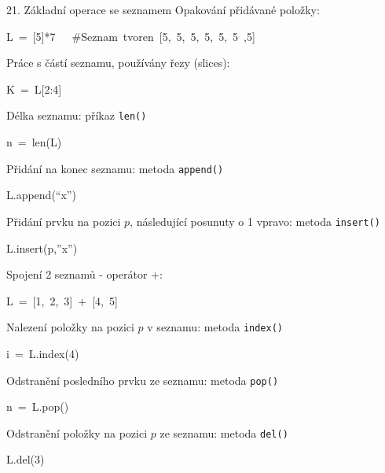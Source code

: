 \documentclass[czech]{beamer}
\newenvironment{lyxcode}
  {\par\begin{list}{}{
    \setlength{\rightmargin}{\leftmargin}
    \setlength{\listparindent}{0pt}%
    \raggedright
    \setlength{\itemsep}{0pt}
    \setlength{\parsep}{0pt}
    \normalfont\ttfamily}%
   \def\{{\char`\{}
   \def\}{\char`\}}
   \def\textasciitilde{\char`\~}
   \item[]}
  {\end{list}}
\begin{document}
\begin{frame}[plain]{21. Základní operace se seznamem}
{\scriptsize Opakování přidávané položky:}{\scriptsize\par}
\begin{lyxcode}
{\scriptsize L~=~{[}5{]}{*}7~~~\#Seznam~tvoren~{[}5,~5,~5,~5,~5,~5~,5{]}}{\scriptsize\par}
\end{lyxcode}
{\scriptsize Práce s částí seznamu, používány řezy (slices):}{\scriptsize\par}
\begin{lyxcode}
{\scriptsize K~=~L{[}2:4{]}~}{\scriptsize\par}
\end{lyxcode}
{\scriptsize Délka seznamu: příkaz }{\scriptsize\texttt{len()}}{\scriptsize\par}
\begin{lyxcode}
{\scriptsize n~=~len(L)}{\scriptsize\par}
\end{lyxcode}
{\scriptsize Přidání na konec seznamu: metoda }{\scriptsize\texttt{append()}}{\scriptsize\par}
\begin{lyxcode}
{\scriptsize L.append(``x'')}{\scriptsize\par}
\end{lyxcode}
{\scriptsize Přidání prvku na pozici $p$, následující posunuty o 1
vpravo: metoda }{\scriptsize\texttt{insert()}}{\scriptsize\par}
\begin{lyxcode}
{\scriptsize L.insert(p,''x'')}{\scriptsize\par}
\end{lyxcode}
{\scriptsize Spojení 2 seznamů - operátor +:}{\scriptsize\par}
\begin{lyxcode}
{\scriptsize L~=~{[}1,~2,~3{]}~+~{[}4,~5{]}~}{\scriptsize\par}
\end{lyxcode}
{\scriptsize Nalezení položky na pozici $p$ v seznamu: metoda }{\scriptsize\texttt{index()}}{\scriptsize\par}
\begin{lyxcode}
{\scriptsize i~=~L.index(4)}{\scriptsize\par}
\end{lyxcode}
{\scriptsize Odstranění posledního prvku ze seznamu: metoda }{\scriptsize\texttt{pop()}}{\scriptsize\par}
\begin{lyxcode}
{\scriptsize n~=~L.pop()}{\scriptsize\par}
\end{lyxcode}
{\scriptsize Odstranění položky na pozici $p$ ze seznamu: metoda }{\scriptsize\texttt{del()}}{\scriptsize\par}
\begin{lyxcode}
{\scriptsize L.del(3)}{\scriptsize\par}
\end{lyxcode}
\end{frame}
\end{document}
